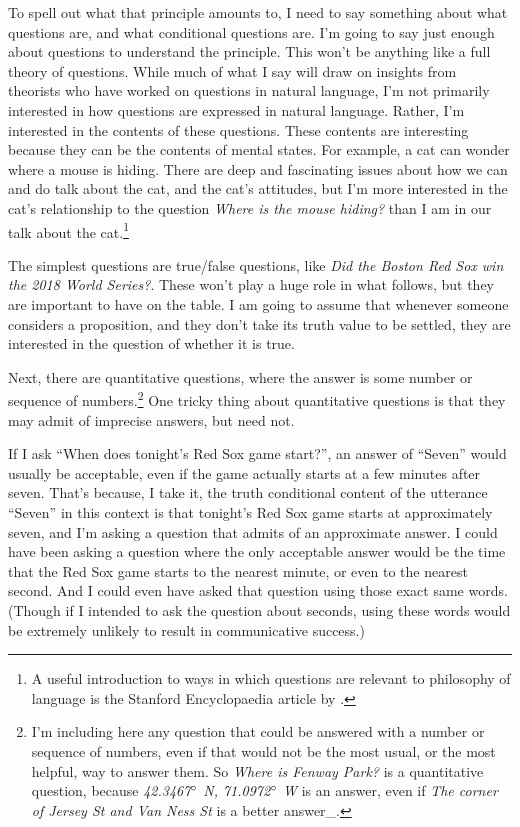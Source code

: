\documentclass[11pt,]{book}
\let\rmarkdownfootnote\footnote%
\def\footnote{\protect\rmarkdownfootnote}
\begin{document}
To spell out what that principle amounts to, I need to say something about what questions are, and what conditional questions are. I'm going to say just enough about questions to understand the principle. This won't be anything like a full theory of questions. While much of what I say will draw on insights from theorists who have worked on questions in natural language, I'm not primarily interested in how questions are expressed in natural language. Rather, I'm interested in the contents of these questions. These contents are interesting because they can be the contents of mental states. For example, a cat can wonder where a mouse is hiding. There are deep and fascinating issues about how we can and do talk about the cat, and the cat's attitudes, but I'm more interested in the cat's relationship to the question \emph{Where is the mouse hiding?} than I am in our talk about the cat.\footnote{A useful introduction to ways in which questions are relevant to philosophy of language is the Stanford Encyclopaedia article by \citet{sep-questions}. }

The simplest questions are true/false questions, like \emph{Did the Boston Red Sox win the 2018 World Series?}. These won't play a huge role in what follows, but they are important to have on the table. I am going to assume that whenever someone considers a proposition, and they don't take its truth value to be settled, they are interested in the question of whether it is true.

Next, there are quantitative questions, where the answer is some number or sequence of numbers.\footnote{I'm including here any question that could be answered with a number or sequence of numbers, even if that would not be the most usual, or the most helpful, way to answer them. So \emph{Where is Fenway Park?} is a quantitative question, because \emph{42.3467\(\degree\) N, 71.0972\(\degree\) W} is an answer, even if \emph{The corner of Jersey St and Van Ness St} is a better answer\_.} One tricky thing about quantitative questions is that they may admit of imprecise answers, but need not.

If I ask ``When does tonight's Red Sox game start?'', an answer of ``Seven'' would usually be acceptable, even if the game actually starts at a few minutes after seven. That's because, I take it, the truth conditional content of the utterance ``Seven'' in this context is that tonight's Red Sox game starts at approximately seven, and I'm asking a question that admits of an approximate answer. I could have been asking a question where the only acceptable answer would be the time that the Red Sox game starts to the nearest minute, or even to the nearest second. And I could even have asked that question using those exact same words. (Though if I intended to ask the question about seconds, using these words would be extremely unlikely to result in communicative success.)
\end{document}

